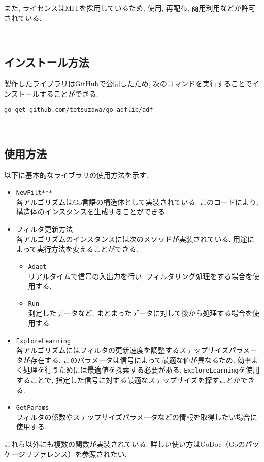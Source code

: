 また, ライセンスはMITを採用しているため, 使用, 再配布, 商用利用などが許可されている. %

\
\subsection{インストール方法}\label{how-to-install}

製作したライブラリはGitHub\cite{go-adflib:online}で公開したため, 次のコマンドを実行することでインストールすることができる. 

\texttt{go\ get\ github.com/tetsuzawa/go-adflib/adf}

\
\subsection{使用方法}\label{how-to-use}

以下に基本的なライブラリの使用方法を示す. 

\begin{itemize}
\tightlist
\item
  \texttt{NewFilt***} \\ 
  各アルゴリズムはGo言語の構造体として実装されている. このコードにより, 構造体のインスタンスを生成することができる. 
\item
  フィルタ更新方法 \\
  各アルゴリズムのインスタンスには次のメソッドが実装されている. 用途によって実行方法を変えることができる. 

  \begin{itemize}
  \tightlist
  \item
    \texttt{Adapt} \\
    リアルタイムで信号の入出力を行い, フィルタリング処理をする場合を使用する. 
  \item
    \texttt{Run} \\
    測定したデータなど, まとまったデータに対して後から処理する場合を使用する
  \end{itemize}
\item
  \texttt{ExploreLearning} \\
  各アルゴリズムにはフィルタの更新速度を調整するステップサイズパラメータが存在する. このパラメータは信号によって最適な値が異なるため, 効率よく処理を行うためには最適値を探索する必要がある. \texttt{ExploreLearning}を使用することで, 指定した信号に対する最適なステップサイズを探すことができる. 
\item
  \texttt{GetParams} \\
  フィルタの係数やステップサイズパラメータなどの情報を取得したい場合に使用する. 
\end{itemize}

これら以外にも複数の関数が実装されている. 詳しい使い方はGoDoc（Goのパッケージリファレンス）\cite{godoc:online}を参照されたい. 
